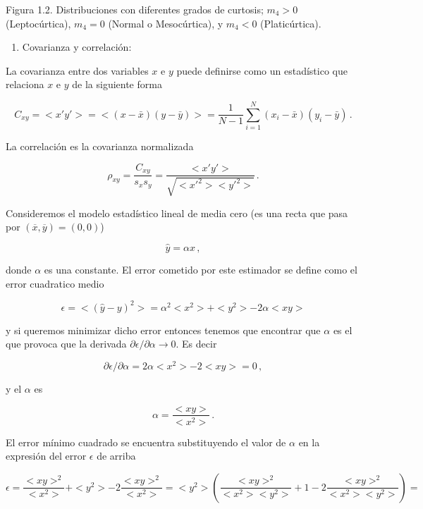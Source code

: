 \documentclass[
]{agujournal2019}
\providecommand{\tightlist}{%
  \setlength{\itemsep}{0pt}\setlength{\parskip}{0pt}}\usepackage{longtable,booktabs,array}
\begin{document}
\begin{center}
\end{center}

\begin{center}
Figura 1.2. Distribuciones con diferentes grados de curtosis; $m_4>0$ (Leptocúrtica),
$m_4=0$ (Normal o Mesocúrtica), y $m_4<0$ (Platicúrtica).
\end{center}

\vspace{0.5cm}

\begin{enumerate}
\def\labelenumi{(\arabic{enumi})}
\setcounter{enumi}{4}
\tightlist
\item
  Covarianza y correlación:\\
\end{enumerate}

La covarianza entre dos variables \(x\) e \(y\) puede definirse como un
estadístico que relaciona \(x\) e \(y\) de la siguiente forma

\[C_{xy}=<x'y'>=<(x-\bar{x})(y-\bar{y})>=\frac{1}{N-1}\sum\limits^N_{i=1} (x_i-\bar{x})(y_i-\bar{y})\,.\]

La correlación es la covarianza normalizada

\[\rho_{x y}=\frac{C_{x y}}{s_x s_y}=\frac{<x' y'>}{\sqrt{<x'^2><y'^2>}}\,. \]

Consideremos el modelo estadístico lineal de media cero (es una recta
que pasa por \((\overline{x},\overline{y})=(0,0)\))

\[\hat{y}=\alpha x\,,\]

donde \(\alpha\) es una constante. El error cometido por este estimador
se define como el error cuadratico medio

\[\epsilon=<(\hat{y}-y)^2>=\alpha^2<x^2>+<y^2>-2\alpha<xy>\]

y si queremos minimizar dicho error entonces tenemos que encontrar que
\(\alpha\) es el que provoca que la derivada
\(\partial{\epsilon}/\partial{\alpha}\rightarrow{0}\). Es decir

\[\partial{\epsilon}/\partial{\alpha}=2\alpha<x^2>-2<xy>=0\,,\]

y el \(\alpha\) es

\[\alpha=\frac{<xy>}{<x^2>}\,.\]

El error mínimo cuadrado se encuentra substituyendo el valor de
\(\alpha\) en la expresión del error \(\epsilon\) de arriba

\[\epsilon=\frac{<xy>^2}{<x^2>} + <y^2> - 2\frac{<xy>^2}{<x^2>}=
           <y^2>\left(\frac{<xy>^2}{<x^2><y^2>}+1-2\frac{<xy>^2}{<x^2><y^2>}\right)=\]
\end{document}
